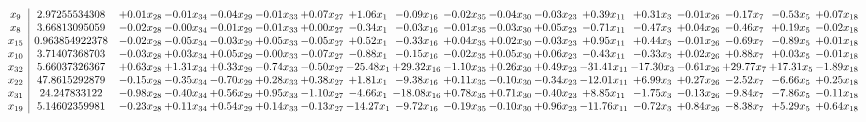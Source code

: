 \documentclass[9pt]{article}
\begin{document}
 \[\begin{array}{c| c c@{\hskip 2pt} c@{\hskip 2pt} c@{\hskip 2pt} c@{\hskip 2pt} c@{\hskip 2pt} c@{\hskip 2pt} c@{\hskip 2pt} c@{\hskip 2pt} c@{\hskip 2pt} c@{\hskip 2pt} c@{\hskip 2pt} c@{\hskip 2pt} c@{\hskip 2pt} c@{\hskip 2pt} c@{\hskip 2pt} c@{\hskip 2pt} }
 x_{9}   &  2.97255534308 & +  0.01 x_{28} & -0.01 x_{34} & -0.04 x_{29} & -0.01 x_{33} & +  0.07 x_{27} & +  1.06 x_{1} & -0.09 x_{16} & -0.02 x_{35} & -0.04 x_{30} & -0.03 x_{23} & +  0.39 x_{11} & +  0.31 x_{3} & -0.01 x_{26} & -0.17 x_{7} & -0.53 x_{5} & +  0.07 x_{18}\\
 x_{8}   &  3.66813095059 & -0.02 x_{28} & -0.00 x_{34} & -0.01 x_{29} & -0.01 x_{33} & +  0.00 x_{27} & -0.34 x_{1} & -0.03 x_{16} & -0.01 x_{35} & -0.03 x_{30} & +  0.05 x_{23} & -0.71 x_{11} & -0.47 x_{3} & +  0.04 x_{26} & -0.46 x_{7} & +  0.19 x_{5} & -0.02 x_{18}\\
 x_{15}   &  0.963854922378 & -0.02 x_{28} & -0.05 x_{34} & -0.03 x_{29} & +  0.05 x_{33} & -0.05 x_{27} & +  0.52 x_{1} & -0.33 x_{16} & +  0.04 x_{35} & +  0.02 x_{30} & -0.03 x_{23} & +  0.95 x_{11} & +  0.44 x_{3} & -0.01 x_{26} & -0.69 x_{7} & -0.89 x_{5} & +  0.01 x_{18}\\
 x_{10}   &  3.71407368703 & -0.03 x_{28} & +  0.03 x_{34} & +  0.05 x_{29} & -0.00 x_{33} & -0.07 x_{27} & -0.88 x_{1} & -0.15 x_{16} & -0.02 x_{35} & +  0.05 x_{30} & +  0.06 x_{23} & -0.43 x_{11} & -0.33 x_{3} & +  0.02 x_{26} & +  0.88 x_{7} & +  0.03 x_{5} & -0.01 x_{18}\\
 x_{32}   &  5.66037326367 & +  0.63 x_{28} & +  1.31 x_{34} & +  0.33 x_{29} & -0.74 x_{33} & -0.50 x_{27} & -25.48 x_{1} & + 29.32 x_{16} & -1.10 x_{35} & +  0.26 x_{30} & +  0.49 x_{23} & -31.41 x_{11} & -17.30 x_{3} & -0.61 x_{26} & + 29.77 x_{7} & + 17.31 x_{5} & -1.89 x_{18}\\
 x_{22}   &  47.8615292879 & -0.15 x_{28} & -0.35 x_{34} & -0.70 x_{29} & +  0.28 x_{33} & +  0.38 x_{27} & +  1.81 x_{1} & -9.38 x_{16} & +  0.11 x_{35} & -0.10 x_{30} & -0.34 x_{23} & -12.01 x_{11} & +  6.99 x_{3} & +  0.27 x_{26} & -2.52 x_{7} & -6.66 x_{5} & +  0.25 x_{18}\\
 x_{31}   &  24.247833122 & -0.98 x_{28} & -0.40 x_{34} & +  0.56 x_{29} & +  0.95 x_{33} & -1.10 x_{27} & -4.66 x_{1} & -18.08 x_{16} & +  0.78 x_{35} & +  0.71 x_{30} & -0.40 x_{23} & +  8.85 x_{11} & -1.75 x_{3} & -0.13 x_{26} & -9.84 x_{7} & -7.86 x_{5} & -0.11 x_{18}\\
 x_{19}   &  5.14602359981 & -0.23 x_{28} & +  0.11 x_{34} & +  0.54 x_{29} & +  0.14 x_{33} & -0.13 x_{27} & -14.27 x_{1} & -9.72 x_{16} & -0.19 x_{35} & -0.10 x_{30} & +  0.96 x_{23} & -11.76 x_{11} & -0.72 x_{3} & +  0.84 x_{26} & -8.38 x_{7} & +  5.29 x_{5} & +  0.64 x_{18}\\

\end{array}\]
\end{document}
